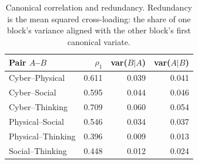\begin{table}[!t]
\caption{Canonical correlation and redundancy. Redundancy is the mean squared
cross-loading: the share of one block's variance aligned with the other block's
first canonical variate.}
\label{tab:redundancy}
\centering
\begin{tabular}{lrrr}
\toprule
Pair $A$--$B$ & $\rho_1$ & var($B|A$) & var($A|B$) \\
\midrule
Cyber--Physical & 0.611 & 0.039 & 0.041 \\
Cyber--Social & 0.595 & 0.044 & 0.046 \\
Cyber--Thinking & 0.709 & 0.060 & 0.054 \\
Physical--Social & 0.546 & 0.034 & 0.037 \\
Physical--Thinking & 0.396 & 0.009 & 0.013 \\
Social--Thinking & 0.448 & 0.012 & 0.024 \\
\bottomrule
\end{tabular}
\end{table}
